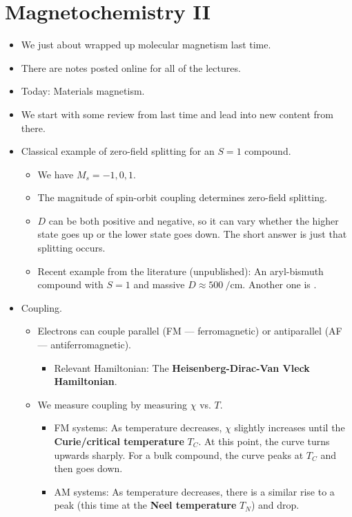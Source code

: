 \documentclass[../notes.tex]{subfiles}
\begin{document}
\section{Magnetochemistry II}
\begin{itemize}
    \item {}We just about wrapped up molecular magnetism last time.
    \item There are notes posted online for all of the lectures.
    \item Today: Materials magnetism.
    \item We start with some review from last time and lead into new content from there.
    \item Classical example of zero-field splitting for an $S=1$ compound.
    \begin{itemize}
        \item We have $M_s=-1,0,1$.
        \item The magnitude of spin-orbit coupling determines zero-field splitting.
        \item $D$ can be both positive and negative, so it can vary whether the higher state goes up or the lower state goes down. The short answer is just that splitting occurs.
        \item Recent example from the literature (unpublished): An aryl-bismuth compound with $S=1$ and massive $D\approx\SI{500}{\per\centi\meter}$. Another one is .
    \end{itemize}
    \item Coupling.
    \begin{itemize}
        \item Electrons can couple parallel (FM --- ferromagnetic) or antiparallel (AF --- antiferromagnetic).
        \begin{itemize}
            \item Relevant Hamiltonian: The \textbf{Heisenberg-Dirac-Van Vleck Hamiltonian}.
        \end{itemize}
        \item We measure coupling by measuring $\chi$ vs. $T$.
        \begin{itemize}
            \item FM systems: As temperature decreases, $\chi$ slightly increases until the \textbf{Curie/critical temperature} $T_C$. At this point, the curve turns upwards sharply. For a bulk compound, the curve peaks at $T_C$ and then goes down.
            \item AM systems: As temperature decreases, there is a similar rise to a peak (this time at the \textbf{Neel temperature} $T_N$) and drop.

\end{itemize}
\end{itemize}
\end{itemize}
\end{document}
